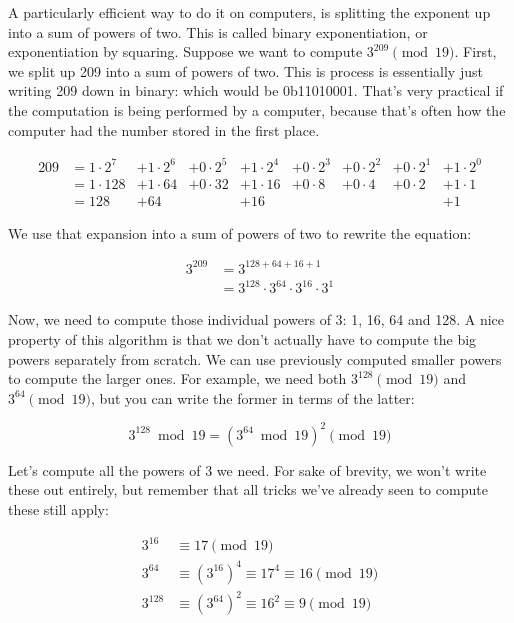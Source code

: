 \documentclass[11pt,ebook,table,dvipsnames]{memoir}
\begin{document}
A particularly efficient way to do it on computers, is splitting the
exponent up into a sum of powers of two. This is called binary
exponentiation, or exponentiation by squaring. Suppose we want to
compute $3^{209} \pmod {19}$. First, we split up 209 into a sum of
powers of two. This is process is essentially just writing 209 down in
binary: which would be 0b11010001. That's very practical if the
computation is being performed by a computer, because that's often how
the computer had the number stored in the first place.

\[
  \begin{array}{lllllllll}
  209 &= 1 \cdot 2^{7} &+ 1 \cdot 2^{6} &+ 0 \cdot 2^{5} &+ 1 \cdot 2^{4} &+ 0 \cdot 2^{3} &+ 0 \cdot 2^{2} &+ 0 \cdot 2^{1} &+ 1 \cdot 2^{0} \\
      &= 1 \cdot 128   &+ 1 \cdot 64    &+ 0 \cdot 32    &+ 1 \cdot 16    &+ 0 \cdot 8     &+ 0 \cdot 4     &+ 0 \cdot 2     &+ 1 \cdot 1 \\
      &= 128           &+ 64            &                &+ 16            &                &                &                &+ 1
  \end{array}
\]

We use that expansion into a sum of powers of two to rewrite the equation:

\begin{align*}
3^{209} &= 3^{128 + 64 + 16 + 1} \\
        &= 3^{128} \cdot 3^{64} \cdot 3^{16} \cdot 3^1
\end{align*}

Now, we need to compute those individual powers of 3: 1, 16, 64
and 128. A nice property of this algorithm is that we don't actually
have to compute the big powers separately from scratch. We can use
previously computed smaller powers to compute the larger ones. For
example, we need both $3^{128} \pmod {19}$ and $3^{64} \pmod {19}$, but
you can write the former in terms of the latter:

\[
3^{128} \bmod {19} = (3^{64} \bmod {19})^2 \pmod {19}
\]

Let's compute all the powers of 3 we need. For sake of brevity, we
won't write these out entirely, but remember that all tricks we've
already seen to compute these still apply:

\begin{align*}
3^{16}  &\equiv 17                               \pmod {19} \\
3^{64}  &\equiv (3^{16})^4 \equiv 17^4 \equiv 16 \pmod {19} \\
3^{128} &\equiv (3^{64})^2 \equiv 16^2 \equiv 9  \pmod {19}
\end{align*}
\end{document}
